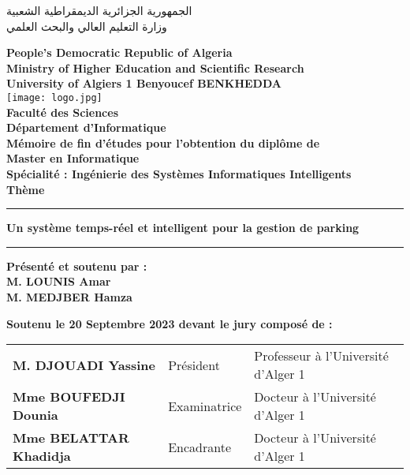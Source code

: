 \thispagestyle{empty}
\begin{arabtex}
\par\noindent
\small
\begin{center}
الجمهورية الجزائرية الديمقراطية الشعبية \\ وزارة التعليم العالي والبحث العلمي  
\end{center}
\end{arabtex}
\begin{center}
	\textbf{People’s Democratic Republic of Algeria} \\
	\textbf{Ministry of Higher Education and Scientific Research} \\
	\textbf{University of Algiers 1 Benyoucef BENKHEDDA}\\

	\texttt{[image: logo.jpg]}\\

	\textbf{Faculté des Sciences} \\
	\textbf{Département d'Informatique}\\
	\textbf{Mémoire de fin d’études pour l’obtention du diplôme de\\ Master en Informatique} \\
	\textbf{Spécialité : Ingénierie des Systèmes Informatiques Intelligents}\\

	
	\textbf{{\large{Thème}}}
	\vspace{0.125cm}\noindent
	\rule{\textwidth}{2pt} 
	\Large\bf{Un système temps-réel et intelligent pour la gestion de parking} 
\end{center}
\noindent
  \rule{\textwidth}{2pt}
\vspace{0.1cm}
\par
\begin{center}
\textbf{Présenté et soutenu par :} \\
	\textbf{M. LOUNIS Amar}\\
	\textbf{M. MEDJBER Hamza}
	\vspace{0.5cm}
	\par
 \end{center}
{\bf Soutenu le 20 Septembre 2023 devant le jury composé de : } 
\begin{center}
\vspace{0.1cm}
	\begin{tabular}{lll}
		\bf M.  DJOUADI Yassine & Président &  Professeur à l'Université d'Alger 1   \\
		\bf Mme BOUFEDJI Dounia & Examinatrice & Docteur à l'Université d'Alger 1    \\
        \bf Mme BELATTAR Khadidja & Encadrante & Docteur à l'Université d'Alger 1   \\
	\end{tabular}


\vspace{2.0 cm}
\par

\end{center}